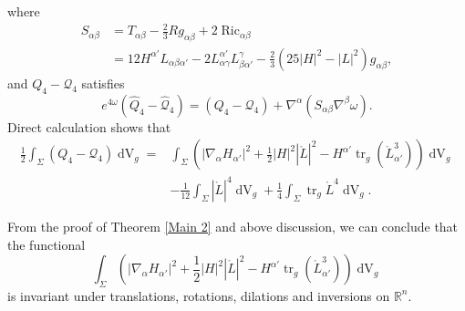 \documentclass[11pt,letterpaper]{amsart}
\DeclareMathOperator{\tr}{tr}
\DeclareMathOperator{\dvol}{dV}
\DeclareMathOperator{\Ric}{Ric}
\newcommand{\mQ}{\mathcal{Q}}
\newcommand{\bR}{\mathbb{R}}
\theoremstyle{definition}
\theoremstyle{remark}
\numberwithin{equation}{section}
\begin{document}
where 
\begin{equation*}
    \begin{split}
        S_{\alpha\beta}&=T_{\alpha\beta}-\frac{2}{3}R g_{\alpha\beta}+2\Ric_{\alpha\beta}\\
        &=12H^{\alpha'}L_{\alpha\beta\alpha'}-2L^{\alpha'}_{\alpha\gamma}L^{\gamma}_{\beta\alpha'}-\frac{2}{3} \left(25|H|^2-|L|^2\right)g_{\alpha\beta},
    \end{split}
\end{equation*}
and $Q_4-\mQ_4$ satisfies
\begin{equation*}
    e^{4\omega}\left(\hat{Q}_4-\hat{\mQ}_4\right)=\left({Q}_4-{\mQ}_4\right)+ \nabla^{\alpha}\left(S_{\alpha\beta}\nabla^{\beta}\omega\right).
\end{equation*}
Direct calculation shows that
\begin{equation*}
\begin{split}
    \frac{1}{2}\int_{\Sigma}\left({Q}_4-{\mQ}_4\right)\dvol_g=&\int_{\Sigma} \left(\big|\nabla_{\alpha}H_{\alpha'}\big|^2+\frac{1}{2}|H|^2|\mathring{L}|^2-H^{\alpha'}\tr_g\left(\mathring{L}^3_{\alpha'}\right)\right)\dvol_g\\
    &-\frac{1}{12}\int_{\Sigma}|\mathring{L}|^4 \dvol_g+\frac{1}{4}\int_{\Sigma}\tr_g \mathring{L}^4\dvol_g.
    \end{split}
\end{equation*}


From the proof of Theorem \ref{Main 2} and above discussion, we can conclude that the functional
\begin{equation}\label{new-conformal-invariant}
    \int_{\Sigma} \left(\big|\nabla_{\alpha}H_{\alpha'}\big|^2+\frac{1}{2}|H|^2|\mathring{L}|^2-H^{\alpha'}\tr_g\left(\mathring{L}^3_{\alpha'}\right)\right)\dvol_g
\end{equation}
is invariant under translations, rotations, dilations and inversions on $\bR^n$.
\end{document}
